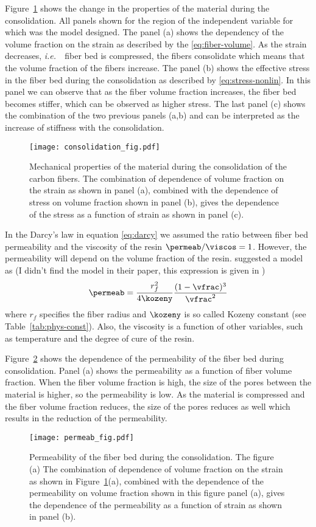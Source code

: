 \documentclass[twoside,a4paper,12pt]{article}
\newcommand{\figref}[1]{Figure~\ref{#1}}
\newcommand{\tabref}[1]{Table~\ref{#1}}
\newcommand{\ie}{{\it i.e.\ }}
\newcommand{\note}[1]{{\color{red}(#1)}}
\newcommand{\note}[1]{}
\begin{document}
\figref{fig:consolidation} shows the change in the properties of the material during the consolidation. All panels shown for the region of the independent variable for which was the model designed. The panel (a) shows the dependency of the volume fraction on the strain as described by the \eqref{eq:fiber-volume}. As the strain decreases, \ie\ fiber bed is compressed, the fibers consolidate which means that the volume fraction of the fibers increase. The panel (b) shows the effective stress in the fiber bed during the consolidation as described by \eqref{eq:stress-nonlin}. In this panel we can observe that as the fiber volume fraction increases, the fiber bed becomes stiffer, which can be observed as higher stress. The last panel (c) shows the combination of the two previous panels (a,b) and can be interpreted as the increase of stiffness with the consolidation.
%
\begin{figure}
  \centering
  \texttt{[image: consolidation\_fig.pdf]}
  \caption{Mechanical properties of the material during the consolidation of the carbon fibers. The combination of dependence of volume fraction on the strain as shown in panel (a), combined with the dependence of stress on volume fraction shown in panel (b), gives the dependence of the stress as a function of strain as shown in panel (c).}
  \label{fig:consolidation}
\end{figure}

In the Darcy's law in equation \eqref{eq:darcy} we assumed the ratio
between fiber bed permeability and the viscosity of the resin
$\permeab/\viscos=1$. However, the permeability will depend on the volume
fraction of the resin. \citet{Dave1987b} suggested a model as
%
\note{I didn't find the model in their paper, this expression is given in \citet{Hubert1999}}
%
\begin{align}
  \permeab = \frac{r_f^2}{4\kozeny} \frac{(1-\vfrac)^3}{\vfrac^2} \label{eq:permeability}
\end{align}
%
where $r_f$ specifies the fiber radius and $\kozeny$ is so called Kozeny
constant (see \tabref{tab:phys-const}). Also, the viscosity is a
function of other variables, such as temperature and the degree of
cure of the resin.

\figref{fig:permeab} shows the dependence of the permeability of the fiber bed during consolidation. Panel (a) shows the permeability as a function of  fiber volume fraction. When the fiber volume fraction is  high, the size of the pores between the material is higher, so the permeability is low. As the material is compressed and the fiber volume fraction reduces, the size of the pores reduces as well which results in the reduction of the permeability.
%
\begin{figure}
  \centering
  \texttt{[image: permeab\_fig.pdf]}
  \caption{Permeability of the fiber bed during the consolidation.
    The figure (a) The combination of dependence of volume fraction on
    the strain as shown in \figref{fig:consolidation}(a), combined
      with the dependence of the permeability on volume fraction shown
      in this figure panel (a), gives the dependence of the
      permeability as a function of strain as shown in panel (b).}
  \label{fig:permeab}
\end{figure}
\end{document}
